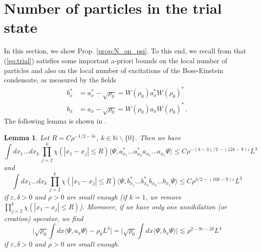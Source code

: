 \documentclass[a4paper,11pt]{article}
\def\bN{\mathbb{N}}
\def\eps{\varepsilon}
\newtheorem{lemma}[theorem]{Lemma}
\numberwithin{equation}{section}
\begin{document}
\section{Number of particles in the trial state}

In this section, we show Prop. \ref{prop:N_on_psi}. To this end, we recall from \cite{BBCOS} that (\ref{eq:trial}) satisfies some important a-priori bounds on the local number of particles and also on the local number of excitations of the Bose-Einstein condensate, as measured by the fields 
\begin{equation}\label{eq:bb} \begin{split} b^*_x &= a^*_x - \sqrt{\rho_0} = W (\rho_0) a^*_x W(\rho_0)^* \\  b_x &= a_x - \sqrt{\rho_0} = W(\rho_0) a_x W(\rho_0)^*\,. \end{split} \end{equation} 
The following lemma is shown in \cite[Lemma 4.3, Lemma 4.4]{BBCOS}.
\begin{lemma} \label{lm:a-bds} 
Let $R = C \rho^{-1/2-3\eps}$, $k \in \bN \backslash \{ 0 \}$. Then we have 
\begin{equation}\label{eq:kas}  \int dx_1 \dots dx_k \, \prod_{j=2}^k \chi (|x_1 - x_j| \leq R)  \langle \Psi, a_{x_1}^* \dots a_{x_k}^* a_{x_k} \dots a_{x_1} \Psi \rangle \leq C \rho^{-(k-3)/2 - (12 k -9) \eps} L^3 \end{equation} 
and 
\begin{equation}\label{eq:kbs}  \int dx_1 \dots dx_k \, \prod_{j=2}^k \chi (|x_1 - x_j| \leq R)  \langle \Psi, b_{x_1}^* \dots b_{x_k}^* b_{x_k} \dots b_{x_1} \Psi \rangle \leq C \rho^{3/2 - (10k -9) \eps} L^3 \end{equation} 
if $\eps, \delta > 0$ and $\rho > 0$ are small enough (if $k=1$, we remove $\prod_{j=2}^k \chi (|x_1 - x_j| \leq R)$). Moreover, if we have only one annihilation (or creation) operator, we find \begin{equation}\label{eq:1bb} \Big| \sqrt{\rho_0} \int dx\langle \Psi, a_x \Psi \rangle - \rho_0 L^3 \Big| = \Big| \sqrt{\rho_0} \int dx \langle \Psi, b_x \Psi \rangle \Big| \lesssim \rho^{2-9\eps-2\delta} L^3 \end{equation} 
if $\eps, \delta > 0$ and $\rho >0$ are small enough. 
\end{lemma} 
\end{document}
